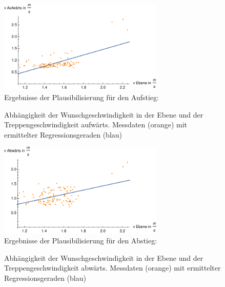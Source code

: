 	\begin{figure}[htpb]
		\centering
		\includegraphics[width=0.7\textwidth]{abbildungen/regression/2012_2017_verbund/auf-ebene.pdf}
		\justify \ \\
		Ergebnisse der Plausibilisierung für den Aufstieg:
		
		\caption{Abhängigkeit der Wunschgeschwindigkeit in der Ebene und der Treppengeschwindigkeit aufwärts. Messdaten (orange) mit ermittelter Regressionsgeraden (blau)}
		\label{fig:2012_und_2017_MA_auf_ebene}
	\end{figure}
	
	\begin{figure}[htpb]
		\centering
		\includegraphics[width=0.7\textwidth]{abbildungen/regression/2012_2017_verbund/ab-ebene.pdf}
		\justify \ \\
		Ergebnisse der Plausibilisierung für den Abstieg:
		
		\caption{Abhängigkeit der Wunschgeschwindigkeit in der Ebene und der Treppengeschwindigkeit abwärts. Messdaten (orange) mit ermittelter Regressionsgeraden (blau)}
		\label{fig:2012_und_2017_MA_ab_ebene}
	\end{figure}
	

